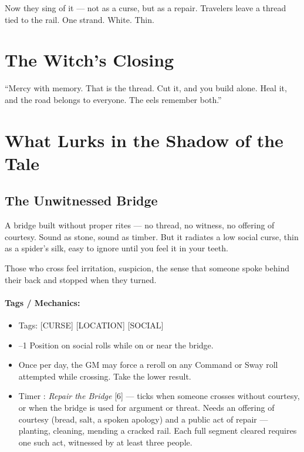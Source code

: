 Now they sing of it --- not as a curse, but as a repair. Travelers leave a thread tied to the rail. One strand. White. Thin.

\section*{The Witch's Closing}

``Mercy with memory. That is the thread. Cut it, and you build alone. Heal it, and the road belongs to everyone. The eels remember both.''

\section*{What Lurks in the Shadow of the Tale}

\subsection*{The Unwitnessed Bridge}

A bridge built without proper rites --- no thread, no witness, no offering of courtesy. Sound as stone, sound as timber. But it radiates a low social curse, thin as a spider's silk, easy to ignore until you feel it in your teeth.

Those who cross feel irritation, suspicion, the sense that someone spoke behind their back and stopped when they turned.

\paragraph{Tags / Mechanics:}

\begin{itemize}
\item Tags: [CURSE] [LOCATION] [SOCIAL]
\item --1 Position on social rolls while on or near the bridge.
\item Once per day, the GM may force a reroll on any Command or Sway roll attempted while crossing. Take the lower result.
\item Timer : \textit{Repair the Bridge} [6] --- ticks when someone crosses without courtesy, or when the bridge is used for argument or threat. Needs an offering of courtesy (bread, salt, a spoken apology) and a public act of repair --- planting, cleaning, mending a cracked rail. Each full segment cleared requires one such act, witnessed by at least three people.
\end{itemize}

